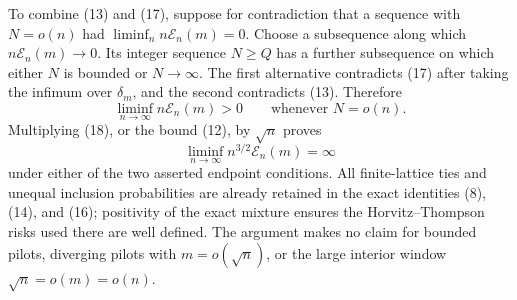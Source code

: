 To combine (13) and (17), suppose for contradiction that a sequence with \(N=o(n)\) had \(\liminf_n n\mathcal E_n(m)=0\).  Choose a subsequence along which \(n\mathcal E_n(m)\to0\).  Its integer sequence \(N\geq Q\) has a further subsequence on which either \(N\) is bounded or \(N\to\infty\).  The first alternative contradicts (17) after taking the infimum over \(\delta_m\), and the second contradicts (13).  Therefore
\[
\liminf_{n\to\infty}n\mathcal E_n(m)>0
\qquad\text{whenever }N=o(n).
\tag{18}
\]
Multiplying (18), or the bound (12), by \(\sqrt n\) proves
\[
\liminf_{n\to\infty}n^{3/2}\mathcal E_n(m)=\infty
\tag{19}
\]
under either of the two asserted endpoint conditions.  All finite-lattice ties and unequal inclusion probabilities are already retained in the exact identities (8), (14), and (16); positivity of the exact mixture ensures the Horvitz--Thompson risks used there are well defined.  The argument makes no claim for bounded pilots, diverging pilots with \(m=o(\sqrt n)\), or the large interior window \(\sqrt n=o(m)=o(n)\).

